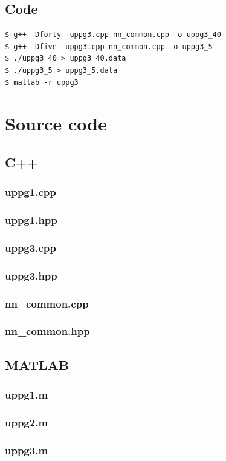 \documentclass[12pt,a4paper]{article}
\begin{document}
\subsection{Code}

\begin{verbatim}
$ g++ -Dforty  uppg3.cpp nn_common.cpp -o uppg3_40 
$ g++ -Dfive  uppg3.cpp nn_common.cpp -o uppg3_5
$ ./uppg3_40 > uppg3_40.data
$ ./uppg3_5 > uppg3_5.data
$ matlab -r uppg3
\end{verbatim}

\newpage

\appendix

\section{Source code}

\subsection{C++}

\subsubsection{uppg1.cpp}


\subsubsection{uppg1.hpp}


\subsubsection{uppg3.cpp}


\subsubsection{uppg3.hpp}


\subsubsection{nn\_common.cpp}


\subsubsection{nn\_common.hpp}


\subsection{MATLAB}

\subsubsection{uppg1.m}


\subsubsection{uppg2.m}



\subsubsection{uppg3.m}

\end{document}
